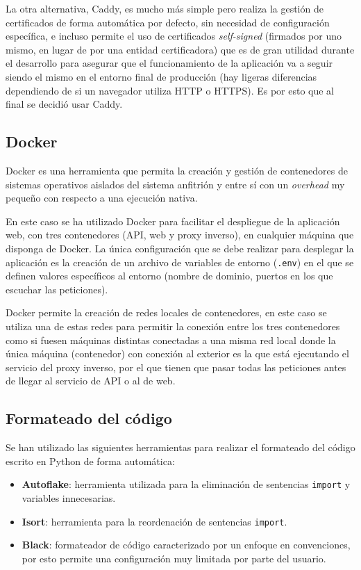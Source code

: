 La otra alternativa, Caddy, es mucho más simple pero realiza la gestión de
certificados de forma automática por defecto, sin necesidad de configuración
específica, e incluso permite el uso de certificados \textit{self-signed}
(firmados por uno mismo, en lugar de por una entidad certificadora) que es de
gran utilidad durante el desarrollo para asegurar que el funcionamiento de la
aplicación va a seguir siendo el mismo en el entorno final de producción (hay
ligeras diferencias dependiendo de si un navegador utiliza HTTP o HTTPS). Es por
esto que al final se decidió usar Caddy.


\subsection{Docker}

Docker es una herramienta que permita la creación y gestión de contenedores de
sistemas operativos aislados del sistema anfitrión y entre sí con un
\textit{overhead} my pequeño con respecto a una ejecución nativa.

En este caso se ha utilizado Docker para facilitar el despliegue de la
aplicación web, con tres contenedores (API, web y proxy inverso), en cualquier
máquina que disponga de Docker. La única configuración que se debe realizar para
desplegar la aplicación es la creación de un archivo de variables de entorno
(\texttt{.env}) en el que se definen valores específicos al entorno (nombre de
dominio, puertos en los que escuchar las peticiones).

Docker permite la creación de redes locales de contenedores, en este caso se
utiliza una de estas redes para permitir la conexión entre los tres contenedores
como si fuesen máquinas distintas conectadas a una misma red local donde la
única máquina (contenedor) con conexión al exterior es la que está ejecutando el
servicio del proxy inverso, por el que tienen que pasar todas las peticiones
antes de llegar al servicio de API o al de web.


\subsection{Formateado del código}

Se han utilizado las siguientes herramientas para realizar el formateado del
código escrito en Python de forma automática:

\begin{itemize}
    \item \textbf{Autoflake}: herramienta utilizada para la eliminación de
          sentencias \texttt{import} y variables innecesarias.
    \item \textbf{Isort}: herramienta para la reordenación de sentencias
          \texttt{import}.
    \item \textbf{Black}: formateador de código caracterizado por un enfoque en
          convenciones, por esto permite una configuración muy limitada por
          parte del usuario.
\end{itemize}


